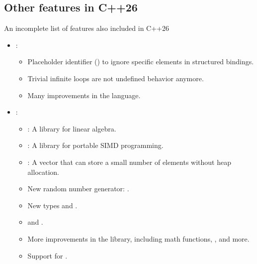 \subsection{Other features in C++26}

\begin{frame}[t,fragile]{An incomplete list of features also included in C++26}
  \begin{itemize}
    \item {}:
      \begin{itemize}
        \item Placeholder identifier () to ignore specific elements in structured bindings.
        \item Trivial infinite loops are not undefined behavior anymore.
        \item Many  improvements in the language.
      \end{itemize}
    \item {}:
      \begin{itemize}
        \item {}: A library for linear algebra.
        \item {}: A library for portable SIMD programming.
        \item {}: A vector that can store a small number of elements without heap allocation.
        \item New random number generator: .
        \item New types  and .
        \item {} and .
        \item More  improvements in the library, including math functions, , and more.
        \item Support for .
      \end{itemize}
  \end{itemize}
\end{frame}